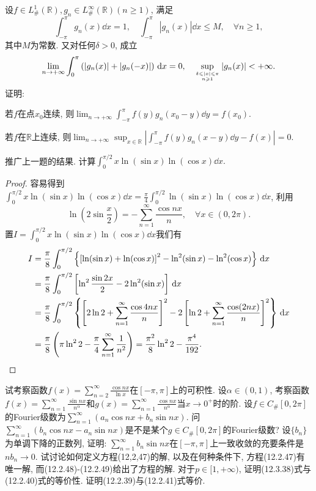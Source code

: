 \begin{quizb}
\woe 设\(f\in L^1_{\#}\left(\mathbb{R}\right),g_n\in L^{\infty}_{\#}(\mathbb{R})(n\geqslant 1)\), 满足\[\int_{-\pi}^{\pi}g_n(x)\dd x=1,\quad\int_{-\pi}^{\pi}|g_n(x)|\dd x\leqslant M,\quad\forall n\geqslant 1,\]其中\(M\)为常数. 又对任何\(\delta>0\), 成立\[\lim_{n\rightarrow+\infty}\int_{0}^{\pi}\left(|g_n(x)|+|g_n(-x)|\right)\,\mathrm{d} x=0,\quad \sup_{\delta\leqslant|x|\leqslant\pi \atop n\geqslant 1}|g_n(x)|<+\infty.\]证明:
\begin{quizs}
\item 若\(f\)在点\(x_0\)连续, 则\(\lim_{n\rightarrow+\infty}\int_{-\pi}^{\pi}f(y)g_n(x_0-y)\dd y=f(x_0)\).
\item 若\(f\)在\(\mathbb{R}\)上连续, 则\(\lim_{n\rightarrow+\infty}\sup_{x\in\mathbb{R}}\left|\int_{-\pi}^{\pi}f(y)g_n(x-y)\dd y-f(x)\right|=0\).
\end{quizs}
\woe 推广上一题的结果.
\woe 计算\(\int_{0}^{\pi/2}x\ln(\sin x)\ln(\cos x)\dd x.\)
\begin{proof}
容易得到\(\int_{0}^{\pi/2}x\ln(\sin x)\ln(\cos x)\dd x=\frac{\pi}{4}\int_{0}^{\pi/2}\ln(\sin x)\ln(\cos x)\dd x\), 利用\[\ln\left(2\sin\frac{x}{2}\right)=-\sum_{n=1}^{\infty}\frac{\cos nx}{n},\quad \forall x\in (0,2\pi).\]
置\(I=\int_{0}^{\pi/2}x\ln(\sin x)\ln(\cos x)\dd x\)我们有\[\begin{split}
I&=\frac{\pi}{8}\int_{0}^{\pi/2}\left\lbrace\left[\ln(\sin x)+\ln(\cos x)\right]^2-\ln^2(\sin x)-\ln^2(\cos x) \right\rbrace\,\mathrm{d} x\\
&=\frac{\pi}{8}\int_{0}^{\pi/2}\left[\ln^2\frac{\sin 2x}{2}-2\ln^2(\sin x)\right]\,\mathrm{d} x\\
&=\frac{\pi}{8}\int_{0}^{\pi/2}\left\lbrace\left[2\ln 2+\sum_{n=1}^{\infty}\frac{\cos 4nx}{n}\right]^2-2\left[\ln 2+\sum_{n=1}^{\infty}\frac{\cos(2nx)}{n}\right]^2 \right\rbrace\,\mathrm{d} x\\
&=\frac{\pi}{8}\left(\pi\ln^2 2-\frac{\pi}{4}\sum_{n=1}^{\infty}\frac{1}{n^2}\right)=\frac{\pi^2}{8}\ln^22-\frac{\pi^4}{192}.\qedhere
\end{split}\]
\end{proof}
\woe 试考察函数\(f(x)=\sum_{n=2}^{\infty}\frac{\cos nx}{\ln x}\)在\([-\pi,\pi]\)上的可积性.
\woe 设\(\alpha\in(0,1)\), 考察函数\(f(x)=\sum_{n=1}^{\infty}\frac{\sin nx}{n^\alpha}\)和\(g(x)=\sum_{n=1}^{\infty}\frac{\cos nx}{n^\alpha}\)当\(x\rightarrow 0^+\)时的阶.
\woe 设\(f\in C_{\#}[0,2\pi]\)的Fourier级数为\(\sum_{n=1}^{\infty}\left(a_n\cos nx+b_n\sin nx\right)\). 问\(\sum_{n=1}^{\infty}\left(b_n\cos nx-a_n\sin nx\right)\)是不是某个\(g\in C_{\#}[0,2\pi]\)的Fourier级数?
\woe 设\(\{b_n\}\)为单调下降的正数列, 证明: \(\sum_{n=1}^{\infty}b_n\sin nx\)在\([-\pi,\pi]\)上一致收敛的充要条件是\(nb_n\rightarrow 0\).
\woe 试讨论如何定义方程(12,2,47)的解, 以及在何种条件下, 方程(12.2.47)有唯一解, 而(12.2.48)-(12.2.49)给出了方程的解.
\woe 对于\(p\in[1,+\infty)\), 证明(12.3.38)式与(12.2.40)式的等价性.
\woe 证明(12.2.39)与(12.2.41)式等价.
\end{quizb}
